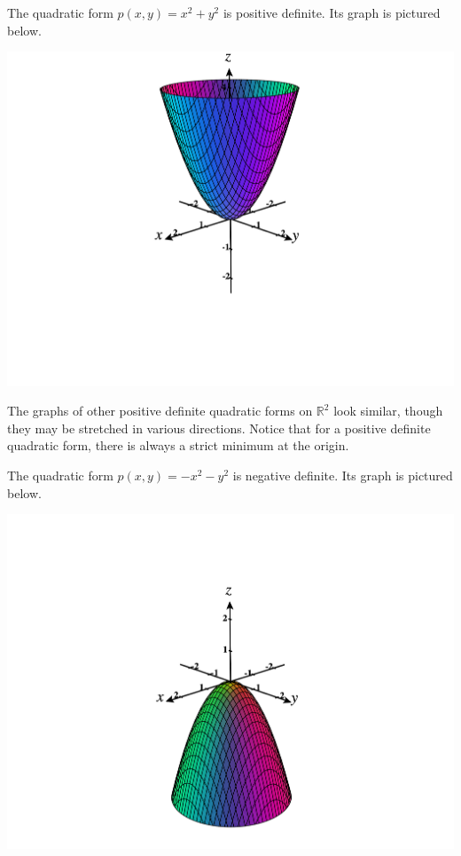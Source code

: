 \documentclass{ximera}
\begin{document}
\begin{example}
The quadratic form $p(x,y) = x^2+y^2$ is positive definite. Its graph is pictured below.

\begin{image}
\includegraphics[width=\textwidth]{CalcPlot3D-pos_def}
\end{image}

The graphs of other positive definite quadratic forms on $\mathbb{R}^2$ look similar, though they may be stretched in various directions. Notice that for a positive definite quadratic form, there is always a strict minimum at the origin.

The quadratic form $p(x,y) = -x^2-y^2$ is negative definite. Its graph is pictured below.

\begin{image}
\includegraphics[width=\textwidth]{CalcPlot3D-neg_def}
\end{image}


\end{example}
\end{document}
